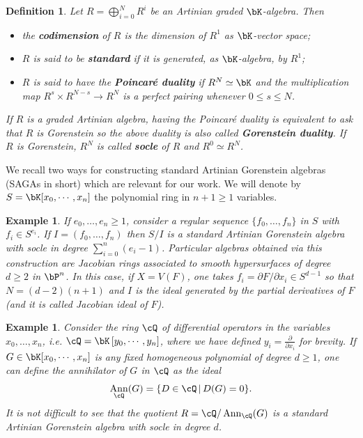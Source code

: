 \documentclass[a4paper,11pt]{amsart}
\newtheorem{definition}[theorem]{Definition}
\newtheorem{example}[theorem]{Example}
\DeclareMathOperator{\Ann}{Ann}
\begin{document}
\begin{definition}
\label{DEF:ARTGOR}
Let $R=\bigoplus_{i=0}^NR^i$ be an Artinian graded $\bK$-algebra. Then
\begin{itemize}
    \item the {\bf codimension} of $R$ is the dimension of $R^1$ as $\bK$-vector space; 
    \item $R$ is said to be {\bf standard} if it is generated, as $\bK$-algebra, by $R^1$;
    \item $R$ is said to have the {\bf Poincar{\'e} duality} if $R^N\simeq \bK$ and the multiplication map $R^s\times R^{N-s}\to R^{N}$ is a perfect pairing whenever $0\leq s\leq N$.
\end{itemize}
If $R$ is a graded Artinian algebra, having the Poincar{\'e} duality is equivalent to ask that $R$ is Gorenstein so the above duality is also called {\bf Gorenstein duality}. If $R$ is Gorenstein, $R^N$ is called {\bf socle} of $R$ and $R^0\simeq R^N$. 
\end{definition}

We recall two ways for constructing standard Artinian Gorenstein algebras (SAGAs in short) which are relevant for our work. We will denote by $S=\bK[x_0,\cdots,x_n]$ the polynomial ring in $n+1\geq1$ variables.

\begin{example}
\label{EX:SAGAviaREGSEQ}
If $e_0,\dots,e_n\geq 1$, consider a regular sequence $\{f_0,\dots,f_n\}$ in $S$ with $f_i\in S^{e_i}$. If $I=(f_0,\dots,f_n)$ then $S/I$ is a standard Artinian Gorenstein algebra with socle in degree $\sum_{i=0}^n(e_i-1)$. Particular algebras obtained via this construction are Jacobian rings associated to smooth hypersurfaces of degree $d\geq 2$ in $\bP^n$. In this case, if $X=V(F)$, one takes $f_i=\partial F/\partial x_i\in S^{d-1}$ so that $N=(d-2)(n+1)$ and $I$ is the ideal generated by the partial derivatives of $F$ (and it is called Jacobian ideal of $F$). 
\end{example}

\begin{example}
\label{EX:SAGAviaANN}
Consider the ring $\cQ$ of differential operators in the variables $x_0,\dots,x_n$, i.e. $\cQ=\bK\left[y_0,\cdots,y_n\right]$, where we have defined $y_i=\frac{\partial}{\partial x_i}$ for brevity. If $G\in \bK[x_0,\cdots,x_n]$ is any fixed homogeneous polynomial of degree $d\geq 1$, one can define the annihilator of $G$ in $\cQ$ as the ideal $$\Ann_{\cQ}(G)=\{D\in \cQ\,|\, D(G)=0\}.$$
It is not difficult to see that the quotient $R=\cQ/\Ann_{\cQ}(G)$ is a standard Artinian Gorenstein algebra with socle in degree $d$. 
\end{example}
\end{document}
